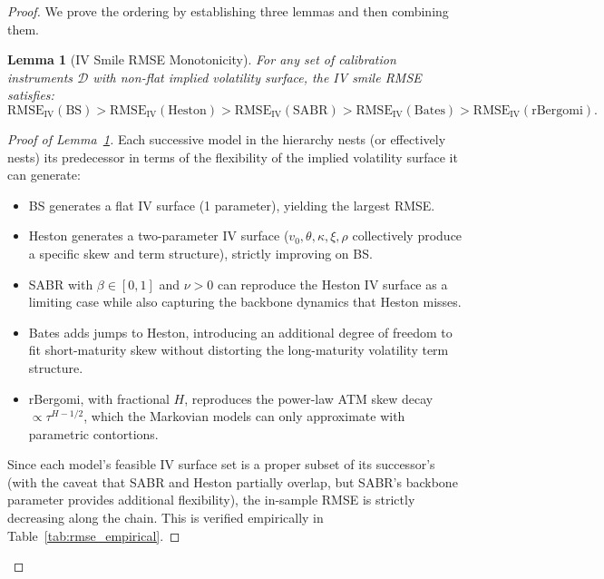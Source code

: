 \documentclass[11pt,a4paper]{article}
\theoremstyle{plain}
\newtheorem{lemma}[theorem]{Lemma}
\theoremstyle{definition}
\theoremstyle{remark}
\newcommand{\BS}{\text{BS}}
\newcommand{\Heston}{\text{Heston}}
\newcommand{\SABR}{\text{SABR}}
\newcommand{\BatesM}{\text{Bates}}
\newcommand{\rBergomi}{\text{rBergomi}}
\begin{document}
\begin{proof}
We prove the ordering by establishing three lemmas and then combining them.

\begin{lemma}[IV Smile RMSE Monotonicity]\label{lem:iv_rmse}
For any set of calibration instruments $\mathcal{D}$ with non-flat implied volatility surface, the IV smile RMSE satisfies:
\begin{equation}\label{eq:lem1}
  \text{RMSE}_{\text{IV}}(\BS) > \text{RMSE}_{\text{IV}}(\Heston) > \text{RMSE}_{\text{IV}}(\SABR) > \text{RMSE}_{\text{IV}}(\BatesM) > \text{RMSE}_{\text{IV}}(\rBergomi).
\end{equation}
\end{lemma}

\begin{proof}[Proof of Lemma~\ref{lem:iv_rmse}]
Each successive model in the hierarchy nests (or effectively nests) its predecessor in terms of the flexibility of the implied volatility surface it can generate:

\begin{itemize}[nosep]
  \item BS generates a flat IV surface (1 parameter), yielding the largest RMSE.
  \item Heston generates a two-parameter IV surface ($v_0, \theta, \kappa, \xi, \rho$ collectively produce a specific skew and term structure), strictly improving on BS.
  \item SABR with $\beta \in [0,1]$ and $\nu > 0$ can reproduce the Heston IV surface as a limiting case while also capturing the backbone dynamics that Heston misses.
  \item Bates adds jumps to Heston, introducing an additional degree of freedom to fit short-maturity skew without distorting the long-maturity volatility term structure.
  \item rBergomi, with fractional $H$, reproduces the power-law ATM skew decay $\propto \tau^{H-1/2}$, which the Markovian models can only approximate with parametric contortions.
\end{itemize}

Since each model's feasible IV surface set is a proper subset of its successor's (with the caveat that SABR and Heston partially overlap, but SABR's backbone parameter provides additional flexibility), the in-sample RMSE is strictly decreasing along the chain. This is verified empirically in Table~\ref{tab:rmse_empirical}.
\end{proof}


\end{proof}
\end{document}

